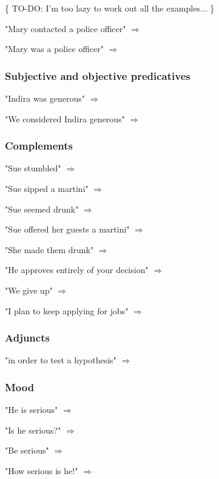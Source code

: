 \{ TO-DO: I'm too lazy to work out all the examples... \}

"Mary contacted a police officer" $\Longrightarrow$ \formula{}

"Mary was a police officer" $\Longrightarrow$ \formula{}

\subsubsection{Subjective and objective predicatives}

"Indira was generous" $\Longrightarrow$ \formula{}

"We considered Indira generous" $\Longrightarrow$ \formula{}

\subsubsection{Complements}

"Sue stumbled" $\Longrightarrow$ \formula{}

"Sue sipped a martini" $\Longrightarrow$ \formula{}

"Sue seemed drunk" $\Longrightarrow$ \formula{}

"Sue offered her guests a martini" $\Longrightarrow$ \formula{}

"She made them drunk" $\Longrightarrow$ \formula{}

"He approves entirely of your decision" $\Longrightarrow$ \formula{}

"We give up" $\Longrightarrow$ \formula{}

"I plan to keep applying for jobs" $\Longrightarrow$ \formula{}

\subsubsection{Adjuncts}

"in order to test a hypothesis" $\Longrightarrow$ \formula{}

\subsubsection{Mood}

"He is serious" $\Longrightarrow$ \formula{}

"Is he serious?" $\Longrightarrow$ \formula{}

"Be serious" $\Longrightarrow$ \formula{}

"How serious is he!" $\Longrightarrow$ \formula{}

